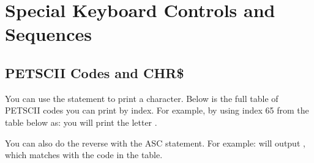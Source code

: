 
\chapter{Special Keyboard Controls and Sequences}


\section{PETSCII Codes and CHR\$}

\label{appendix:asciicodes}

You can use the  statement to print a character.
Below is the full table of PETSCII codes you can print by index.  For example, by
using index 65 from the table below as:  you will
print the letter .

You can also do the reverse with the ASC statement.  For example:
 will output , which matches with the
code in the table.


